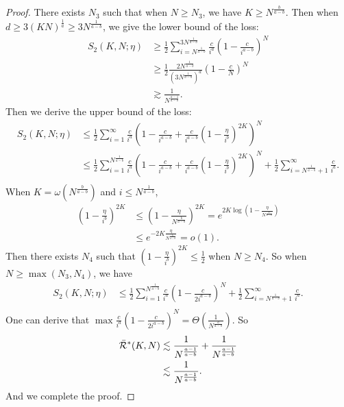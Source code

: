 \begin{proof}
There exists $N_3$ such that when $N\geq N_3$, we have $K\geq N^{\frac{b}{a-b}}$. Then when $d\geq 3(KN)^{\frac{1}{a}}\geq 3N^{\frac{1}{a-b}}$, we give the lower bound of the loss:
\begin{align*}
    S_2(K,N;\eta)&\geq \frac{1}{2}\sum_{i=N^{\frac{1}{a-b}}}^{3N^{\frac{1}{a-b}}}\frac{c}{i^{a}}\left(1-\frac{c}{i^{a-b}}\right)^N \\
    &\geq \frac{1}{2}\frac{2N^{\frac{1}{a-b}}}{(3N^{\frac{1}{a-b}})^{a}}(1-\frac{c}{N})^N \\
    &\gtrsim \frac{1}{N^{\frac{a-1}{a-b}}}.
\end{align*}
Then we derive the upper bound of the loss:
\begin{align*}
    S_2(K,N;\eta)&\leq \frac{1}{2}\sum_{i=1}^{\infty}\frac{c}{i^{a}}\left(1-\frac{c}{i^{a-b}}+\frac{c}{i^{a-b}}\left(1-\frac{\eta}{i^b}\right)^{2K}\right)^N \\
    &\leq \frac{1}{2}\sum_{i=1}^{N^{\frac{1}{a-b}}}\frac{c}{i^{a}}\left(1-\frac{c}{i^{a-b}}+\frac{c}{i^{a-b}}\left(1-\frac{\eta}{i^b}\right)^{2K}\right)^N+\frac{1}{2}\sum_{i=N^{\frac{1}{a-b}}+1}^{\infty}\frac{c}{i^{a}}. \\
\end{align*}
When $K = \omega(N^{\frac{b}{a-b}})$ and $i\leq N^{\frac{1}{a-b}}$, 
\begin{align*}
    \left(1-\frac{\eta}{i^b}\right)^{2K} &\leq \left(1-\frac{\eta}{N^{\frac{b}{a-b}}}\right)^{2K} = e^{2K\log \left(1-\frac{\eta}{N^{\frac{b}{a-b}}}\right)} \\
    &\leq e^{-2K\frac{\eta}{N^{\frac{b}{a-b}}}} = o(1).
\end{align*}    
Then there exists $N_4$ such that $\left(1-\frac{\eta}{i^b}\right)^{2K}\leq\frac{1}{2}$ when $N\geq N_4$. So when $N\geq \max(N_3, N_4)$, we have
\begin{align*}
    S_2(K,N;\eta)&\leq \frac{1}{2}\sum_{i=1}^{N^{\frac{1}{a-b}}}\frac{c}{i^{a}}\left(1-\frac{c}{2i^{a-b}}\right)^N+\frac{1}{2}\sum_{i=N^{\frac{1}{a-b}}+1}^{\infty}\frac{c}{i^{a}}. \\
\end{align*} 
One can derive that $\max \frac{c}{i^{a}}\left(1-\frac{c}{2i^{a-b}}\right)^N = \Theta\left(\frac{1}{N^{\frac{a}{a-b}}}\right)$. So
\begin{align*}
    \Bar{\mathcal{R}}^*(K, N)
    &\lesssim \frac{1}{N^{\frac{a-1}{a-b}}}+\frac{1}{N^{\frac{a-1}{a-b}}}\\
    &\lesssim \frac{1}{N^{\frac{a-1}{a-b}}}.
\end{align*}
And we complete the proof.
\end{proof}
